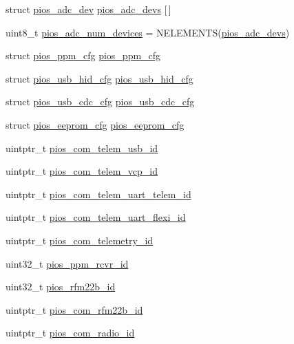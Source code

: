 \begin{DoxyCompactItemize}
\item 
struct \hyperlink{structpios__adc__dev}{pios\-\_\-adc\-\_\-dev} \hyperlink{group___pip_xtreme_ga60479077e81beceb101d711cefa0dd04}{pios\-\_\-adc\-\_\-devs} \mbox{[}$\,$\mbox{]}
\item 
uint8\-\_\-t \hyperlink{group___pip_xtreme_ga28c65992d20cf6fca97cd69b271e47cf}{pios\-\_\-adc\-\_\-num\-\_\-devices} = \-N\-E\-L\-E\-M\-E\-N\-T\-S(\hyperlink{group___pip_xtreme_ga60479077e81beceb101d711cefa0dd04}{pios\-\_\-adc\-\_\-devs})
\item 
struct \hyperlink{structpios__ppm__cfg}{pios\-\_\-ppm\-\_\-cfg} \hyperlink{group___pip_xtreme_ga256c8c512691a72ee2ed15d1a9041810}{pios\-\_\-ppm\-\_\-cfg}
\item 
struct \hyperlink{structpios__usb__hid__cfg}{pios\-\_\-usb\-\_\-hid\-\_\-cfg} \hyperlink{group___pip_xtreme_ga3665f6d3a2cccc431b55b9432291e94c}{pios\-\_\-usb\-\_\-hid\-\_\-cfg}
\item 
struct \hyperlink{structpios__usb__cdc__cfg}{pios\-\_\-usb\-\_\-cdc\-\_\-cfg} \hyperlink{group___pip_xtreme_ga05cc3e449d417c7f9097d2659e6f5ca3}{pios\-\_\-usb\-\_\-cdc\-\_\-cfg}
\item 
struct \hyperlink{structpios__eeprom__cfg}{pios\-\_\-eeprom\-\_\-cfg} \hyperlink{group___pip_xtreme_ga067bf691b4323c59a3ee7228f35e462f}{pios\-\_\-eeprom\-\_\-cfg}
\item 
uintptr\-\_\-t \hyperlink{group___pip_xtreme_ga513cc36d72b76de2fcb75ff233a79a4a}{pios\-\_\-com\-\_\-telem\-\_\-usb\-\_\-id}
\item 
uintptr\-\_\-t \hyperlink{group___pip_xtreme_gaad17224bb36a5f3c73a716320de2b604}{pios\-\_\-com\-\_\-telem\-\_\-vcp\-\_\-id}
\item 
uintptr\-\_\-t \hyperlink{group___pip_xtreme_ga921f0eb0351c5bfb72fa30333cd8dbe1}{pios\-\_\-com\-\_\-telem\-\_\-uart\-\_\-telem\-\_\-id}
\item 
uintptr\-\_\-t \hyperlink{group___pip_xtreme_ga756d20d3ee409603f69b54c0bf4c5584}{pios\-\_\-com\-\_\-telem\-\_\-uart\-\_\-flexi\-\_\-id}
\item 
uintptr\-\_\-t \hyperlink{group___pip_xtreme_gac90e37dffee878bd2e1e9d2020b6a1de}{pios\-\_\-com\-\_\-telemetry\-\_\-id}
\item 
uint32\-\_\-t \hyperlink{group___pip_xtreme_ga6338d4e922eaddddb7e8cb253a901907}{pios\-\_\-ppm\-\_\-rcvr\-\_\-id}
\item 
uint32\-\_\-t \hyperlink{group___pip_xtreme_ga1e0b7d2eb8b8640e07daa1f381780972}{pios\-\_\-rfm22b\-\_\-id}
\item 
uintptr\-\_\-t \hyperlink{group___pip_xtreme_ga960a23c3c0c4fd41826d65e01651b737}{pios\-\_\-com\-\_\-rfm22b\-\_\-id}
\item 
uintptr\-\_\-t \hyperlink{group___pip_xtreme_ga7bf37c2a11a82f3cee715b9e09638dce}{pios\-\_\-com\-\_\-radio\-\_\-id}
\end{DoxyCompactItemize}


